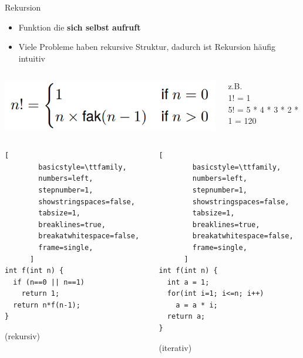 \documentclass[
  german,            %
  aspectratio=169,    %
]{tumbeamer}
\begin{document}
\begin{frame}[c, fragile]{Rekursion}{}
  \begin{itemize}
    \item Funktion die \textbf{sich selbst aufruft}
    \item Viele Probleme haben rekursive Struktur, dadurch ist Rekursion häufig intuitiv
  \end{itemize}
  \begin{columns}[c]
    \begin{column}{0.48\textwidth}
      \includegraphics[width=0.9\linewidth]{w04_fak_rec_zue.png}
    \end{column}
    \begin{column}{0.48\textwidth}
      z.B. \\
      1! = 1 \\
      5! = 5 * 4 * 3 * 2 * 1 = 120
    \end{column}
  \end{columns}
  \begin{columns}[c]
    \begin{column}{0.48\textwidth}
      \begin{lstlisting}[
        basicstyle=\ttfamily,
        numbers=left,
        stepnumber=1,
        showstringspaces=false,
        tabsize=1,
        breaklines=true,
        breakatwhitespace=false,
        frame=single,
      ]
int f(int n) {
  if (n==0 || n==1)
    return 1;
  return n*f(n-1);
}
      \end{lstlisting}
      \centering
      (rekursiv)
    \end{column}
    \begin{column}{0.48\textwidth}
      \begin{lstlisting}[
        basicstyle=\ttfamily,
        numbers=left,
        stepnumber=1,
        showstringspaces=false,
        tabsize=1,
        breaklines=true,
        breakatwhitespace=false,
        frame=single,
      ]
int f(int n) {
  int a = 1;
  for(int i=1; i<=n; i++)
    a = a * i;
  return a;
}
      \end{lstlisting}
      \centering
      (iterativ)
    \end{column}
  \end{columns}
\end{frame}
\end{document}
